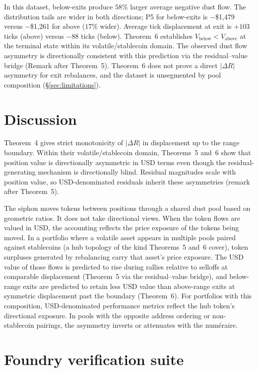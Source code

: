 \documentclass[11pt,a4paper]{article}
\theoremstyle{definition}
\begin{document}
\noindent In this dataset, below-exits produce $58\%$ larger average negative dust flow. The distribution tails are wider in both directions; P5 for below-exits is $-$\$1{,}479 versus $-$\$1{,}261 for above ($17\%$ wider). Average tick displacement at exit is $+103$ ticks (above) versus $-88$ ticks (below). Theorem~6 establishes $V_{\text{below}} < V_{\text{above}}$ at the terminal state within its volatile/stablecoin domain. The observed dust flow asymmetry is directionally consistent with this prediction via the residual--value bridge (Remark after Theorem~5). Theorem~6 does not prove a direct $|\Delta R|$ asymmetry for exit rebalances, and the dataset is unsegmented by pool composition (\S\ref{sec:limitations}).

\section{Discussion}

Theorem~4 gives strict monotonicity of $|\Delta R|$ in displacement up to the range boundary. Within their volatile/stablecoin domain, Theorems~5 and~6 show that position value is directionally asymmetric in USD terms even though the residual-generating mechanism is directionally blind. Residual magnitudes scale with position value, so USD-denominated residuals inherit these asymmetries (remark after Theorem~5).

The siphon moves tokens between positions through a shared dust pool based on geometric ratios. It does not take directional views. When the token flows are valued in USD, the accounting reflects the price exposure of the tokens being moved. In a portfolio where a volatile asset appears in multiple pools paired against stablecoins (a hub topology of the kind Theorems~5 and~6 cover), token surpluses generated by rebalancing carry that asset's price exposure. The USD value of those flows is predicted to rise during rallies relative to selloffs at comparable displacement (Theorem~5 via the residual--value bridge), and below-range exits are predicted to retain less USD value than above-range exits at symmetric displacement past the boundary (Theorem~6). For portfolios with this composition, USD-denominated performance metrics reflect the hub token's directional exposure. In pools with the opposite address ordering or non-stablecoin pairings, the asymmetry inverts or attenuates with the numéraire.

\section{Foundry verification suite}\label{sec:foundry}
\end{document}
